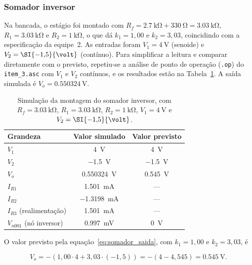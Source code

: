 \documentclass[11pt,a4paper]{article}
\begin{document}
\subsubsection{Somador inversor}

Na bancada, o estágio foi montado com $R_f = \SI{2,7}{\kilo\ohm} + \SI{330}{\ohm} = \SI{3,03}{\kilo\ohm}$, $R_1 = \SI{3,03}{\kilo\ohm}$ e $R_2 = \SI{1}{\kilo\ohm}$, o que dá $k_1 = 1{,}00$ e $k_2 = 3{,}03$, coincidindo com a especificação da equipe~2. As entradas foram $V_1 = \SI{4}{\volt}$ (senoide) e $V_2 = \SI{-1{,}5}{\volt}$ (contínuo). Para simplificar a leitura e comparar diretamente com o previsto, repetiu-se a análise de ponto de operação (\texttt{.op}) do \texttt{item\_3.asc} com $V_1$ e $V_2$ contínuos, e os resultados estão na Tabela~\ref{tab:somador_sim_bancada}. A saída simulada é $V_o = \SI{0,550324}{\volt}$.

\begin{table}[h]
\centering
\caption{Simulação da montagem do somador inversor, com $R_f = \SI{3,03}{\kilo\ohm}$, $R_1 = \SI{3,03}{\kilo\ohm}$, $R_2 = \SI{1}{\kilo\ohm}$, $V_1 = \SI{4}{\volt}$ e $V_2 = \SI{-1{,}5}{\volt}$.}
\label{tab:somador_sim_bancada}
\begin{tabular}{lcc}
\hline
Grandeza & Valor simulado & Valor previsto \\
\hline
$V_1$ & \SI{4}{\volt} & \SI{4}{\volt} \\
$V_2$ & \SI{-1,5}{\volt} & \SI{-1,5}{\volt} \\
$V_o$ & \SI{0,550324}{\volt} & \SI{0,545}{\volt} \\
$I_{R1}$ & \SI{1,501}{\milli\ampere} & --- \\
$I_{R2}$ & \SI{-1,3198}{\milli\ampere} & --- \\
$I_{R3}$ (realimentação) & \SI{1,501}{\milli\ampere} & --- \\
$V_{n001}$ (nó inversor) & \SI{0,997}{\milli\volt} & \SI{0}{\volt} \\
\hline
\end{tabular}
\end{table}

O valor previsto pela equação~\eqref{eq:somador_saida}, com $k_1 = 1{,}00$ e $k_2 = 3{,}03$, é

\begin{equation}
V_o = -(1{,}00 \cdot 4 + 3{,}03 \cdot (-1{,}5)) = -(4 - 4{,}545) = \SI{0,545}{\volt} .
\label{eq:somador_previsto_bancada}
\end{equation}
\end{document}
